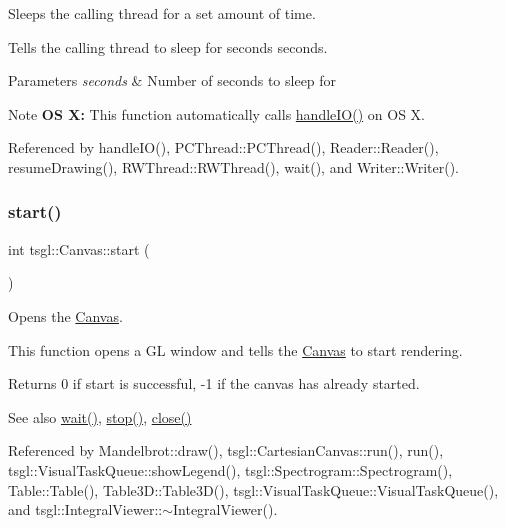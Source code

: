 Sleeps the calling thread for a set amount of time. 

Tells the calling thread to sleep for {\ttfamily seconds} seconds. 
\begin{DoxyParams}{Parameters}
{\em seconds} & Number of seconds to sleep for \\
\hline
\end{DoxyParams}
\begin{DoxyNote}{Note}
{\bfseries OS X\+:} This function automatically calls \hyperlink{classtsgl_1_1_canvas_aa499851e5e4b97bb99ca4fb3d633c17e}{handle\+I\+O()} on OS X. 
\end{DoxyNote}


Referenced by handle\+I\+O(), P\+C\+Thread\+::\+P\+C\+Thread(), Reader\+::\+Reader(), resume\+Drawing(), R\+W\+Thread\+::\+R\+W\+Thread(), wait(), and Writer\+::\+Writer().

\mbox{\label{classtsgl_1_1_canvas_a654315f9b08a9b3b072eebf4b4d8ae89}} 
\subsubsection{\texorpdfstring{start()}{start()}}
{\footnotesize\ttfamily int tsgl\+::\+Canvas\+::start (\begin{DoxyParamCaption}{ }\end{DoxyParamCaption})}



Opens the \hyperlink{classtsgl_1_1_canvas}{Canvas}. 

This function opens a GL window and tells the \hyperlink{classtsgl_1_1_canvas}{Canvas} to start rendering. \begin{DoxyReturn}{Returns}
0 if start is successful, -\/1 if the canvas has already started. 
\end{DoxyReturn}
\begin{DoxySeeAlso}{See also}
\hyperlink{classtsgl_1_1_canvas_a39e69fd4d1ad8cf0e22ecea12f1ddf08}{wait()}, \hyperlink{classtsgl_1_1_canvas_a46cd37a9f2a146e57b4e0273faf6485c}{stop()}, \hyperlink{classtsgl_1_1_canvas_afaa1250b1da6b48b9c170a0655191938}{close()} 
\end{DoxySeeAlso}


Referenced by Mandelbrot\+::draw(), tsgl\+::\+Cartesian\+Canvas\+::run(), run(), tsgl\+::\+Visual\+Task\+Queue\+::show\+Legend(), tsgl\+::\+Spectrogram\+::\+Spectrogram(), Table\+::\+Table(), Table3\+D\+::\+Table3\+D(), tsgl\+::\+Visual\+Task\+Queue\+::\+Visual\+Task\+Queue(), and tsgl\+::\+Integral\+Viewer\+::$\sim$\+Integral\+Viewer().

